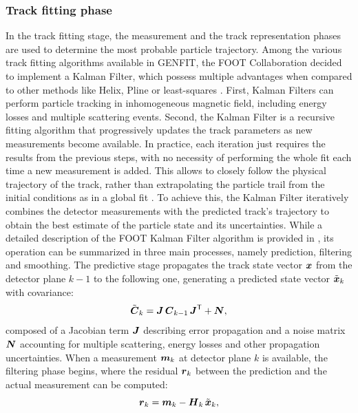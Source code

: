 \subsubsection{Track fitting phase}\label{sssec:trk_fit_phase}
In the track fitting stage, the measurement and the track representation phases are used to determine the most probable particle trajectory. Among the various track fitting algorithms available in GENFIT, the FOOT Collaboration decided to implement a Kalman Filter, which possess multiple advantages when compared to other methods like Helix, Pline or least-squares \cite{Rotondi2009Kalman}. First, Kalman Filters can perform particle tracking in inhomogeneous magnetic field, including energy losses and multiple scattering events. Second, the Kalman Filter is a recursive fitting algorithm that progressively updates the track parameters as new measurements become available. In practice, each iteration just requires the results from the previous steps, with no necessity of performing the whole fit each time a new measurement is added. This allows to closely follow the physical trajectory of the track, rather than extrapolating the particle trail from the initial conditions as in a global fit \cite{slide_arcelli}. To achieve this, the Kalman Filter iteratively combines the detector measurements with the predicted track's trajectory to obtain the best estimate of the particle state and its uncertainties. While a detailed description of the FOOT Kalman Filter algorithm is provided in \cite{ZarrellaPhDThesis}, its operation can be summarized in three main processes, namely prediction, filtering and smoothing. The predictive stage propagates the track state vector $\boldsymbol{x}$ from the detector plane $k-1$ to the following one, generating a predicted state vector $\tilde{\boldsymbol{x}}_k$ with covariance:
\begin{equation}
	\tilde{\boldsymbol{C}}_k = \boldsymbol{J}\, \boldsymbol{C}_{k-1}\, {\boldsymbol{J}}^{\mathsf{T}} + \boldsymbol{N},
	\label{eq:cov_mat_pred}
\end{equation}
composed of a Jacobian term $\boldsymbol{J}$ describing error propagation and a noise matrix $\boldsymbol{N}$ accounting for multiple scattering, energy losses and other propagation uncertainties. When a measurement $\boldsymbol{m}_k$ at detector plane $k$ is available, the filtering phase begins, where the residual $\boldsymbol{r}_k$ between the prediction and the actual measurement can be computed:
\begin{equation}
	\boldsymbol{r}_k = \boldsymbol{m}_k - \boldsymbol{H}_k\, \tilde{\boldsymbol{x}}_k,
	\label{eq:residual_pred}
\end{equation}
